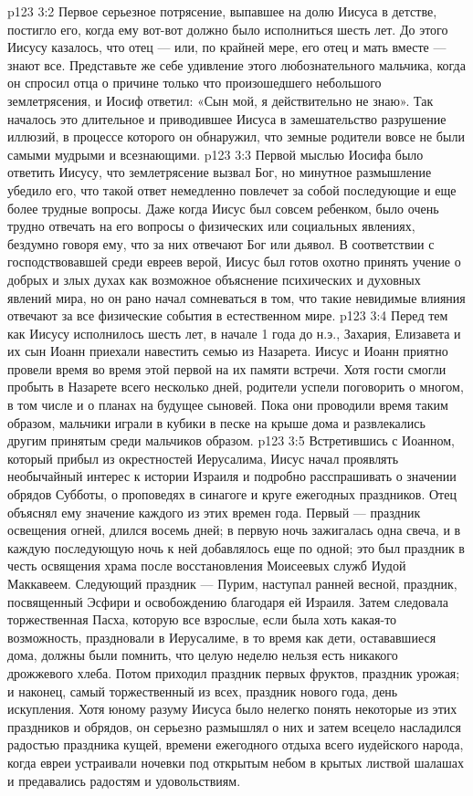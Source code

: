\vs p123 3:2 \pc Первое серьезное потрясение, выпавшее на долю Иисуса в детстве, постигло его, когда ему вот\hyp{}вот должно было исполниться шесть лет. До этого Иисусу казалось, что отец --- или, по крайней мере, его отец и мать вместе --- знают все. Представьте же себе удивление этого любознательного мальчика, когда он спросил отца о причине только что произошедшего небольшого землетрясения, и Иосиф ответил: «Сын мой, я действительно не знаю». Так началось это длительное и приводившее Иисуса в замешательство разрушение иллюзий, в процессе которого он обнаружил, что земные родители вовсе не были самыми мудрыми и всезнающими.
\vs p123 3:3 Первой мыслью Иосифа было ответить Иисусу, что землетрясение вызвал Бог, но минутное размышление убедило его, что такой ответ немедленно повлечет за собой последующие и еще более трудные вопросы. Даже когда Иисус был совсем ребенком, было очень трудно отвечать на его вопросы о физических или социальных явлениях, бездумно говоря ему, что за них отвечают Бог или дьявол. В соответствии с господствовавшей среди евреев верой, Иисус был готов охотно принять учение о добрых и злых духах как возможное объяснение психических и духовных явлений мира, но он рано начал сомневаться в том, что такие невидимые влияния отвечают за все физические события в естественном мире.
\vs p123 3:4 \pc Перед тем как Иисусу исполнилось шесть лет, в начале 1 года до н.э., Захария, Елизавета и их сын Иоанн приехали навестить семью из Назарета. Иисус и Иоанн приятно провели время во время этой первой на их памяти встречи. Хотя гости смогли пробыть в Назарете всего несколько дней, родители успели поговорить о многом, в том числе и о планах на будущее сыновей. Пока они проводили время таким образом, мальчики играли в кубики в песке на крыше дома и развлекались другим принятым среди мальчиков образом.
\vs p123 3:5 \pc Встретившись с Иоанном, который прибыл из окрестностей Иерусалима, Иисус начал проявлять необычайный интерес к истории Израиля и подробно расспрашивать о значении обрядов Субботы, о проповедях в синагоге и круге ежегодных праздников. Отец объяснял ему значение каждого из этих времен года. Первый --- праздник освещения огней, длился восемь дней; в первую ночь зажигалась одна свеча, и в каждую последующую ночь к ней добавлялось еще по одной; это был праздник в честь освящения храма после восстановления Моисеевых служб Иудой Маккавеем. Следующий праздник --- Пурим, наступал ранней весной, праздник, посвященный Эсфири и освобождению благодаря ей Израиля. Затем следовала торжественная Пасха, которую все взрослые, если была хоть какая\hyp{}то возможность, праздновали в Иерусалиме, в то время как дети, остававшиеся дома, должны были помнить, что целую неделю нельзя есть никакого дрожжевого хлеба. Потом приходил праздник первых фруктов, праздник урожая; и наконец, самый торжественный из всех, праздник нового года, день искупления. Хотя юному разуму Иисуса было нелегко понять некоторые из этих праздников и обрядов, он серьезно размышлял о них и затем всецело насладился радостью праздника кущей, времени ежегодного отдыха всего иудейского народа, когда евреи устраивали ночевки под открытым небом в крытых листвой шалашах и предавались радостям и удовольствиям.
